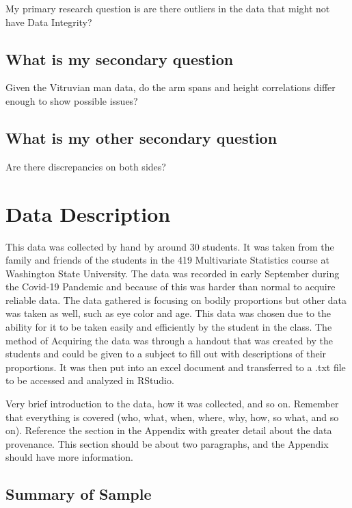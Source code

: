 \documentclass[]{article}
\begin{document}
My primary research question is are there outliers in the data that
might not have Data Integrity? \label{sec:rq}

\subsection{What is my secondary question}

Given the Vitruvian man data, do the arm spans and height correlations
differ enough to show possible issues? \label{sec:rq2}

\subsection{What is my other secondary question}

Are there discrepancies on both sides? \label{sec:rq3}

\section{Data Description}
\label{sec:data}

This data was collected by hand by around 30 students. It was taken from
the family and friends of the students in the 419 Multivariate
Statistics course at Washington State University. The data was recorded
in early September during the Covid-19 Pandemic and because of this was
harder than normal to acquire reliable data. The data gathered is
focusing on bodily proportions but other data was taken as well, such as
eye color and age. This data was chosen due to the ability for it to be
taken easily and efficiently by the student in the class. The method of
Acquiring the data was through a handout that was created by the
students and could be given to a subject to fill out with descriptions
of their proportions. It was then put into an excel document and
transferred to a .txt file to be accessed and analyzed in RStudio.

Very brief introduction to the data, how it was collected, and so on.
Remember that everything is covered (who, what, when, where, why, how,
so what, and so on). Reference the section in the Appendix with greater
detail about the data provenance. This section should be about two
paragraphs, and the Appendix should have more information.

\subsection{Summary of Sample}
\end{document}
